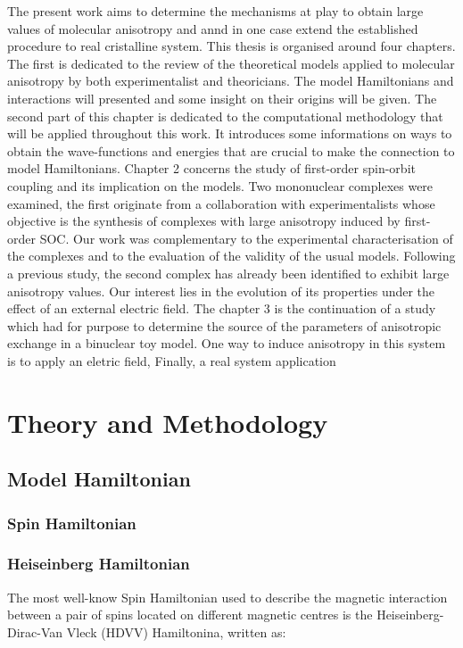 \documentclass[10pt]{report}
\numberwithin{equation}{section}
\begin{document}
The present work aims to determine the mechanisms at play to obtain large values of molecular anisotropy and annd in one case extend the established procedure to real cristalline system.
This thesis is organised around four chapters. The first is dedicated to the review of the theoretical models applied to molecular anisotropy by both experimentalist and theoricians.
The model Hamiltonians and interactions will presented and some insight on their origins will be given.
The second part of this chapter is dedicated to the computational methodology that will be applied throughout this work.
It introduces some informations on ways to obtain the wave-functions and energies that are crucial to make the connection to model Hamiltonians.
Chapter 2 concerns the study of first-order spin-orbit coupling and its implication on the models. 
Two mononuclear complexes were examined, the first originate from a collaboration with experimentalists whose objective is the synthesis of complexes with large anisotropy induced by first-order SOC.
Our work was complementary to the experimental characterisation of the complexes and to the evaluation of the validity of the usual models.
Following a previous study, the second complex has already been identified to exhibit large anisotropy values.
Our interest lies in the evolution of its properties under the effect of an external electric field.
The chapter 3 is the continuation of a study which had for purpose to determine the source of the parameters of anisotropic exchange in a binuclear toy model.
One way to induce anisotropy in this system is to apply an eletric field,
Finally, a real system application 



\chapter{Theory and Methodology}

\section{Model Hamiltonian}

\subsection{Spin Hamiltonian}

\subsection*{Heiseinberg Hamiltonian}
The most well-know Spin Hamiltonian used to describe the magnetic interaction between a pair of spins located on different magnetic centres is the Heiseinberg-Dirac-Van Vleck (HDVV) Hamiltonina, written as:
\end{document}
